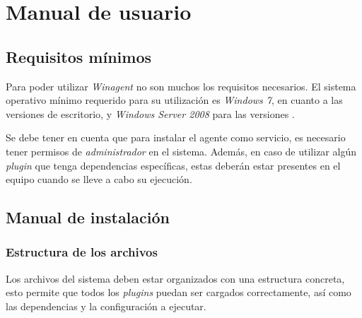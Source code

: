 \section{Manual de usuario} \label{sec:man}
    \subsection{Requisitos mínimos}
        Para poder utilizar \textit{Winagent} no son muchos los requisitos necesarios. El sistema operativo mínimo requerido para su utilización es \textit{Windows 7}, en cuanto a las versiones de escritorio, y \textit{Windows Server 2008} para las versiones .
        
        Se debe tener en cuenta que para instalar el agente como servicio, es necesario tener permisos de \textit{administrador} en el sistema. Además, en caso de utilizar algún \textit{plugin} que tenga dependencias específicas, estas deberán estar presentes en el equipo cuando se lleve a cabo su ejecución.
        
    \subsection{Manual de instalación}
        \subsubsection{Estructura de los archivos}
            Los archivos del sistema deben estar organizados con una estructura concreta, esto permite que todos los \textit{plugins} puedan ser cargados correctamente, así como las dependencias y la configuración a ejecutar.
            
